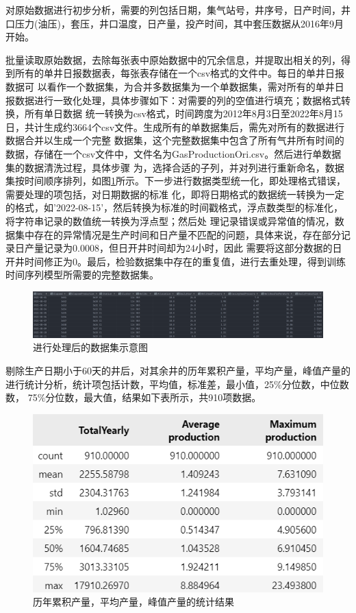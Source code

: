 对原始数据进行初步分析，需要的列包括日期，集气站号，井序号，日产时间，井口压力(油压)，套压，井口温度，日产量，投产时间，其中套压数据从2016年9月开始。

批量读取原始数据，去除每张表中原始数据中的冗余信息，并提取出相关的列，得到所有的单井日报数据表，每张表存储在一个csv格式的文件中。每日的单井日报数据可
以看作一个数据集，为合并多数据集为一个单数据集，需对所有的单井日报数据进行一致化处理，具体步骤如下：对需要的列的空值进行填充；数据格式转换，所有单日数据
统一转换为csv格式，时间跨度为2012年8月3日至2022年8月15日，共计生成约3664个csv文件。生成所有的单数据集后，需先对所有的数据进行数据合并以生成一个完整
数据集，这个完整数据集中包含了所有气井所有时间的数据，存储在一个csv文件中，文件名为GasProductionOri.csv。然后进行单数据集的数据清洗过程，具体步骤
为，选择合适的子列，并对列进行重新命名，数据集按时间顺序排列，如图\ref{fig:afterprocess}所示。下一步进行数据类型统一化，即处理格式错误，需要处理的项包括，对日期数据的标准
化，即将日期格式的数据统一转换为一定的格式，如’2022-08-15’，然后转换为标准的时间戳格式，浮点数类型的标准化，将字符串记录的数值统一转换为浮点型；然后处
理记录错误或异常值的情况，数据集中存在的异常情况是生产时间和日产量不匹配的问题，具体来说，存在部分记录日产量记录为0.0008，但日开井时间却为24小时，因此
需要将这部分数据的日开井时间修正为0。最后，检验数据集中存在的重复值，进行去重处理，得到训练时间序列模型所需要的完整数据集。
\begin{figure}[H]
    \centering
    \includegraphics{figure/afterprocessdata.png}
    \caption{进行处理后的数据集示意图}
    \label{fig:afterprocess}
\end{figure}

剔除生产日期小于60天的井后，对其余井的历年累积产量，平均产量，峰值产量的进行统计分析，统计项包括计数，平均值，标准差，最小值，25\%分位数，中位数数，
75\%分位数，最大值，结果如下表所示，共910项数据。

\begin{figure}[H]
    \centering
    \includegraphics{figure/gasproduction.png}
    \caption{历年累积产量，平均产量，峰值产量的统计结果}
\end{figure}

